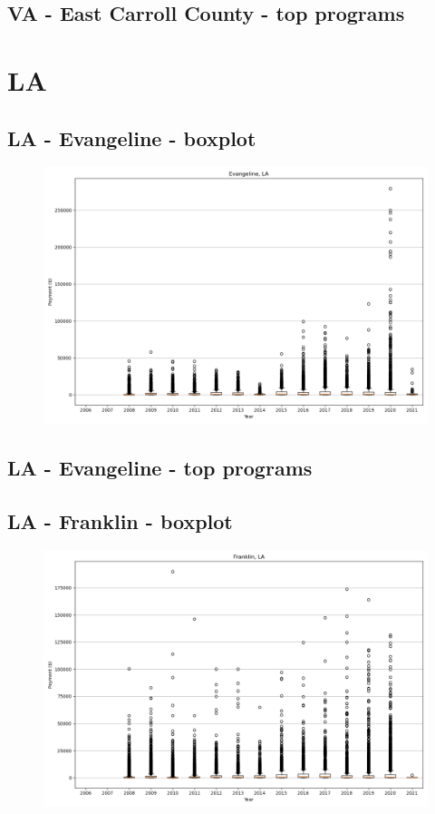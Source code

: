 \subsection*{VA - East Carroll County - top programs}

\newpage
\section*{LA}
\subsection*{LA - Evangeline - boxplot}
\begin{figure}[h]
\centering
\includegraphics[width=7in]{../output/boxplots/counties/Evangeline-LA_boxplot.png}
\end{figure}


\subsection*{LA - Evangeline - top programs}

\newpage
\subsection*{LA - Franklin - boxplot}
\begin{figure}[h]
\centering
\includegraphics[width=7in]{../output/boxplots/counties/Franklin-LA_boxplot.png}
\end{figure}



